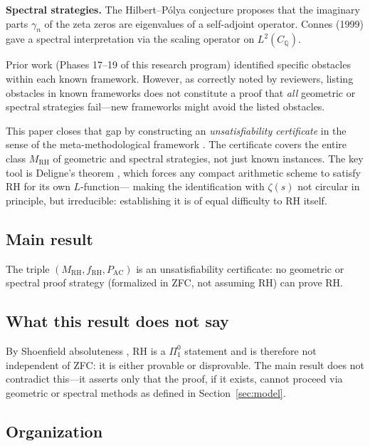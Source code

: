 \documentclass[12pt]{article}
\newcommand{\QQ}{\mathbb{Q}}
\newcommand{\MRH}{M_{\mathrm{RH}}}
\newcommand{\PAC}{P_{\mathrm{AC}}}
\begin{document}
\textbf{Spectral strategies.} The Hilbert--P\'olya conjecture proposes
that the imaginary parts $\gamma_n$ of the zeta zeros are eigenvalues
of a self-adjoint operator. Connes (1999) gave a spectral interpretation
via the scaling operator on $L^2(C_\QQ)$.

Prior work (Phases 17--19 of this research program) identified specific
obstacles within each known framework. However, as correctly noted by
reviewers, listing obstacles in known frameworks does not constitute a
proof that \emph{all} geometric or spectral strategies fail---new
frameworks might avoid the listed obstacles.

This paper closes that gap by constructing an \emph{unsatisfiability
certificate} in the sense of the meta-methodological framework
\cite{metamethod2026}. The certificate covers the entire class
$\MRH$ of geometric and spectral strategies, not just known instances.
The key tool is Deligne's theorem \cite{deligne1974}, which forces
any compact arithmetic scheme to satisfy RH for its own $L$-function---
making the identification with $\zeta(s)$ not circular in principle,
but irreducible: establishing it is of equal difficulty to RH itself.

\subsection*{Main result}

\begin{theorem*}[Informal]
The triple $(\MRH, f_{\mathrm{RH}}, \PAC)$ is an unsatisfiability
certificate: no geometric or spectral proof strategy (formalized in
ZFC, not assuming RH) can prove RH.
\end{theorem*}

\subsection*{What this result does not say}

By Shoenfield absoluteness \cite{shoenfield1961}, RH is a
$\Pi^0_1$ statement and is therefore not independent of ZFC: it is
either provable or disprovable. The main result does not contradict
this---it asserts only that the proof, if it exists, cannot proceed
via geometric or spectral methods as defined in Section~\ref{sec:model}.

\subsection*{Organization}
\end{document}
